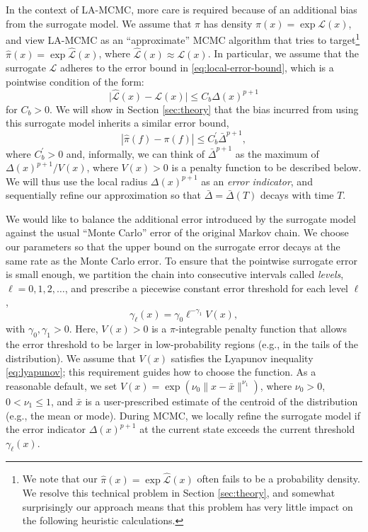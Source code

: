 In the context of LA-MCMC,  more care is required because of an additional bias from the surrogate model. We assume that $\pi$ has density $\pi(x) = \exp{ \mathcal{L}(x) }$, and view LA-MCMC as an ``approximate'' MCMC algorithm that tries to target\footnote{We note that our $\widehat{\pi}(x) = \exp \widehat{\mathcal{L}}(x)$ often fails to be a probability density. We resolve this technical problem in Section \ref{sec:theory}, and somewhat surprisingly our approach means that this problem has very little impact on the following heuristic calculations.} $\hat{\pi}(x) = \exp \widehat{\mathcal{L}}(x)$, where $\widehat{\mathcal{L}}(x) \approx \mathcal{L}(x)$. In particular, we assume that the surrogate $\widehat{\mathcal{L}}$ adheres to the error bound in \eqref{eq:local-error-bound}, which is a pointwise condition of the form: 
\begin{equation}
 \vert \widehat{\mathcal{L}}(x) - {\mathcal{L}}(x) \vert \leq C_{b} \Delta(x)^{p+1}
 \label{eq:transition-kernel-radius-bound}
\end{equation} 
for $C_b>0$. We will show in Section \ref{sec:theory} that the bias incurred from using this surrogate model inherits a similar error bound,
\begin{equation}
    \left| \hat{\pi}(f) - \pi(f) \right| \leq C_{b}^{\prime} \bar{\Delta}^{p+1},
    \label{eq:expectation-error}
\end{equation}
where $C_b^{\prime}>0$ and, informally, we can think of $\bar{\Delta}^{p+1}$ as the maximum of $\Delta(x)^{p+1}/V(x)$, where $V(x) > 0$ is a penalty function to be described below. We will thus use the local radius $\Delta(x)^{p+1}$ as an \textit{error indicator}, and sequentially refine our approximation so that $\bar{\Delta} = \bar{\Delta}(T)$ decays with time $T$.

We would like to balance the additional error introduced by the surrogate model against the usual ``Monte Carlo'' error of the original Markov chain. %
We choose our parameters so that the upper bound on the surrogate error decays at the same rate as the Monte Carlo error. 
%
To ensure that the pointwise surrogate error is small enough, we partition the chain into 
consecutive intervals called \emph{levels}, $\ell = 0, 1, 2, \ldots$, and prescribe a piecewise constant error threshold for each level $\ell$,
\begin{equation}
    \gamma_\ell(x) = \gamma_0 \ell^{-\gamma_1} V(x),
    \label{eq:error-threshold}
\end{equation}
with $\gamma_0, \gamma_1 > 0$.
Here, $V(x) > 0$ is a $\pi$-integrable penalty function that allows the error threshold to be larger in low-probability regions (e.g., in the tails of the distribution). We assume that $V(x)$ satisfies the Lyapunov inequality \eqref{eq:lyapunov}; this requirement guides how to choose the function. As a reasonable default, we set $V(x) = \exp{(\nu_0 \|x-\bar{x}\|^{\nu_1})}$, where $\nu_0>0$, $0 < \nu_1 \leq 1$, and $\bar{x}$ is a user-prescribed estimate of the centroid of the distribution (e.g., the mean or mode). During MCMC, we locally refine the surrogate model if the error indicator $\Delta(x)^{p+1}$ at the current state exceeds the current threshold $\gamma_\ell(x)$. 

